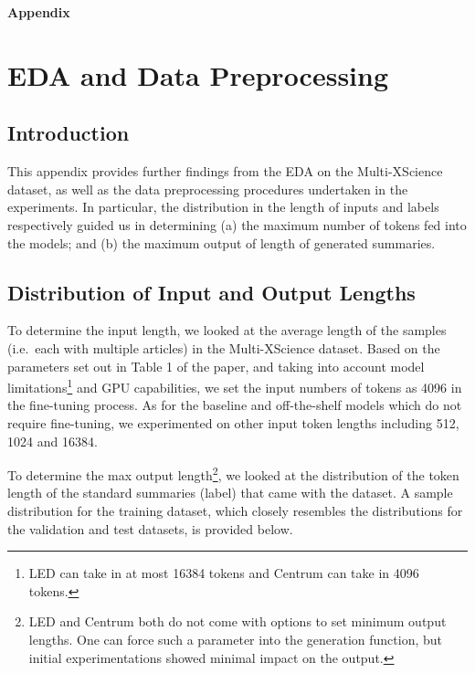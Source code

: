 \documentclass[12pt, twocolumn]{article}
\numberwithin{equation}{section}
\begin{document}
\newpage
\textbf{\Huge Appendix}
\appendix

\section{EDA and Data Preprocessing}
\label{app:eda}

\subsection{Introduction}
\label{app:eda-intro}

This appendix provides further findings from the EDA on the Multi-XScience dataset, as well as the data preprocessing procedures undertaken in the experiments. In particular, the distribution in the length of inputs and labels respectively guided us in determining (a) the maximum number of tokens fed into the models; and (b) the maximum output of length of generated summaries.

\subsection{Distribution of Input and Output Lengths}

To determine the input length, we looked at the average length of the samples (i.e.~each with multiple articles) in the Multi-XScience dataset.  Based on the parameters set out in Table 1 of the paper, and taking into account model limitations\footnote{LED can take in at most 16384 tokens and Centrum can take in 4096 tokens.} and GPU capabilities, we set the input numbers of tokens as 4096 in the fine-tuning process.  As for the baseline and off-the-shelf models which do not require fine-tuning, we experimented on other input token lengths including 512, 1024 and 16384. 

To determine the max output length\footnote{LED and Centrum both do not come with options to set minimum output lengths.  One can force such a parameter into the generation function, but initial experimentations showed minimal impact on the output.}, we looked at the distribution of the token length of the standard summaries (label) that came with the dataset.  A sample distribution for the training dataset, which closely resembles the distributions for the validation and test datasets, is provided below.
\end{document}

